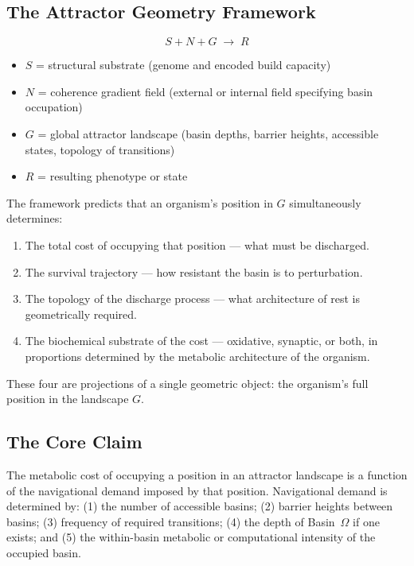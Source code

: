 \documentclass[10pt, a4paper]{article}
\begin{document}
\subsection{The Attractor Geometry Framework}

\[
S + N + G \;\rightarrow\; R
\]

\begin{itemize}[itemsep=0.2em]
  \item $S$ = structural substrate (genome
    and encoded build capacity)
  \item $N$ = coherence gradient field
    (external or internal field specifying
    basin occupation)
  \item $G$ = global attractor landscape
    (basin depths, barrier heights,
    accessible states, topology of
    transitions)
  \item $R$ = resulting phenotype or state
\end{itemize}

The framework predicts that an organism's
position in $G$ simultaneously determines:

\begin{enumerate}[itemsep=0.2em]
  \item The total cost of occupying that
    position --- what must be discharged.
  \item The survival trajectory --- how
    resistant the basin is to perturbation.
  \item The topology of the discharge
    process --- what architecture of rest
    is geometrically required.
  \item The biochemical substrate of the
    cost --- oxidative, synaptic, or both,
    in proportions determined by the
    metabolic architecture of the organism.
\end{enumerate}

These four are projections of a single
geometric object: the organism's full
position in the landscape $G$.

\subsection{The Core Claim}

The metabolic cost of occupying a position
in an attractor landscape is a function
of the navigational demand imposed by
that position. Navigational demand is
determined by: (1) the number of accessible
basins; (2) barrier heights between basins;
(3) frequency of required transitions;
(4) the depth of Basin~$\Omega$ if one
exists; and (5) the within-basin metabolic
or computational intensity of the occupied
basin.
\end{document}
